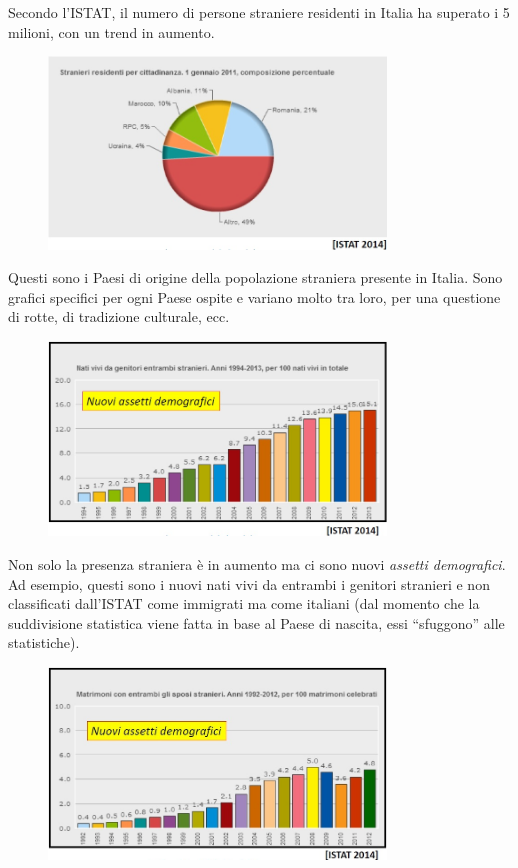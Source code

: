 Secondo l'ISTAT, il numero di persone straniere residenti in Italia ha
superato i 5 milioni, con un trend in aumento.

\begin{figure}[!ht]
\centering
	\includegraphics[width=0.8\textwidth]{26/image11.jpeg}
	\end{figure}

Questi sono i Paesi di origine della popolazione straniera presente in
Italia. Sono grafici specifici per ogni Paese ospite e variano molto tra
loro, per una questione di rotte, di tradizione culturale, ecc.

\begin{figure}[!ht]
\centering
	\includegraphics[width=0.8\textwidth]{26/image12.jpeg}
	\end{figure}

Non solo la presenza straniera è in aumento ma ci sono nuovi
\emph{assetti demografici}. Ad esempio, questi sono i nuovi nati vivi da
entrambi i genitori stranieri e non classificati dall'ISTAT come
immigrati ma come italiani (dal momento che la suddivisione statistica
viene fatta in base al Paese di nascita, essi ``sfuggono'' alle
statistiche).

\begin{figure}[!ht]
\centering
	\includegraphics[width=0.8\textwidth]{26/image13.jpeg}
	\end{figure}

